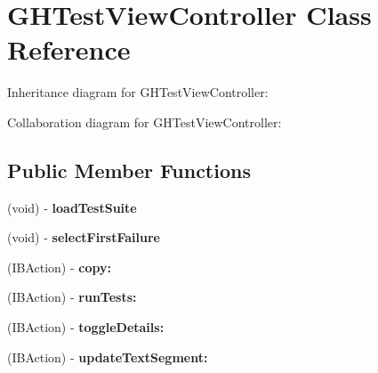\hypertarget{interface_g_h_test_view_controller}{
\section{\-G\-H\-Test\-View\-Controller \-Class \-Reference}
\label{interface_g_h_test_view_controller}
}


\-Inheritance diagram for \-G\-H\-Test\-View\-Controller\-:


\-Collaboration diagram for \-G\-H\-Test\-View\-Controller\-:
\subsection*{\-Public \-Member \-Functions}
\begin{DoxyCompactItemize}
\item 
\hypertarget{interface_g_h_test_view_controller_aeca188a6c689a2ab62b3e0de83a68f31}{
(void) -\/ {\bfseries load\-Test\-Suite}}
\label{interface_g_h_test_view_controller_aeca188a6c689a2ab62b3e0de83a68f31}

\item 
\hypertarget{interface_g_h_test_view_controller_aa7445db9ee94a57863f9ec201fc7458d}{
(void) -\/ {\bfseries select\-First\-Failure}}
\label{interface_g_h_test_view_controller_aa7445db9ee94a57863f9ec201fc7458d}

\item 
\hypertarget{interface_g_h_test_view_controller_a7802b07e5a66a90b3bde5c5303521e81}{
(\-I\-B\-Action) -\/ {\bfseries copy\-:}}
\label{interface_g_h_test_view_controller_a7802b07e5a66a90b3bde5c5303521e81}

\item 
\hypertarget{interface_g_h_test_view_controller_a191f8918dee686d405a8aec6ae9e42fe}{
(\-I\-B\-Action) -\/ {\bfseries run\-Tests\-:}}
\label{interface_g_h_test_view_controller_a191f8918dee686d405a8aec6ae9e42fe}

\item 
\hypertarget{interface_g_h_test_view_controller_afb95139e7516d92c817e0814503e9a5b}{
(\-I\-B\-Action) -\/ {\bfseries toggle\-Details\-:}}
\label{interface_g_h_test_view_controller_afb95139e7516d92c817e0814503e9a5b}

\item 
\hypertarget{interface_g_h_test_view_controller_a4b98ace1598507cd4a4b21bfdfed9839}{
(\-I\-B\-Action) -\/ {\bfseries update\-Text\-Segment\-:}}
\label{interface_g_h_test_view_controller_a4b98ace1598507cd4a4b21bfdfed9839}


\end{DoxyCompactItemize}
